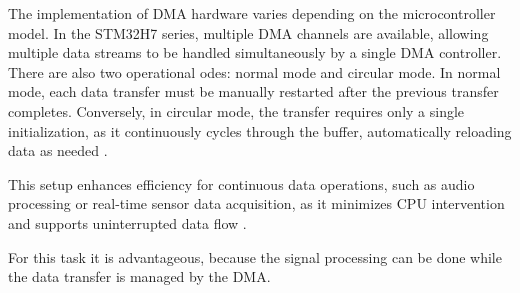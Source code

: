 The implementation of DMA hardware varies depending on the microcontroller model. In the STM32H7 series, multiple \ac{DMA}
channels are available, allowing multiple data streams to be handled simultaneously by a single \ac{DMA} controller. There
are also two operational odes: normal mode and circular mode. In normal mode, each data transfer must be manually
restarted after the previous transfer completes. Conversely, in circular mode, the transfer requires only a single
initialization, as it continuously cycles through the buffer, automatically reloading data as needed \cite{rm0468}.

This setup enhances efficiency for continuous data operations, such as audio processing or real-time sensor data
acquisition, as it minimizes CPU intervention and supports uninterrupted data flow \cite{rm0468}.

For this task it is advantageous, because the signal processing can be done while the data transfer is managed
by the \ac{DMA}.
